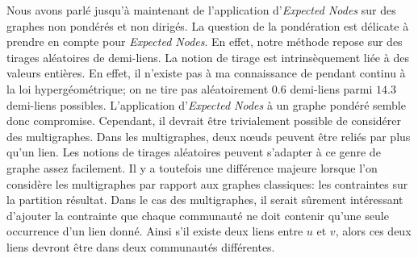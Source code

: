 Nous avons parlé jusqu'à maintenant de l'application d'\emph{Expected Nodes} sur des graphes non pondérés et non dirigés.
La question de la pondération est délicate à prendre en compte pour \emph{Expected Nodes}.
En effet, notre méthode repose sur des tirages aléatoires de demi-liens.
La notion de tirage est intrinsèquement liée à des valeurs entières.
En effet, il n'existe pas à ma connaissance de pendant continu à la loi hypergéométrique;
on ne tire pas aléatoirement $0.6$ demi-liens parmi $14.3$ demi-liens possibles.
L'application d'\emph{Expected Nodes} à un graphe pondéré semble donc compromise.
Cependant, il devrait être trivialement possible de considérer des multigraphes.
Dans les multigraphes, deux n\oe{}uds peuvent être reliés par plus qu'un lien.
Les notions de tirages aléatoires peuvent s'adapter à ce genre de graphe assez facilement.
Il y a toutefois une différence majeure lorsque l'on considère les multigraphes par rapport aux graphes classiques: les contraintes sur la partition résultat.
Dans le cas des multigraphes, il serait sûrement intéressant d'ajouter la contrainte que chaque communauté ne doit contenir qu'une seule occurrence d'un lien donné.
Ainsi s'il existe deux liens entre $u$ et $v$, alors ces deux liens devront être dans deux communautés différentes.